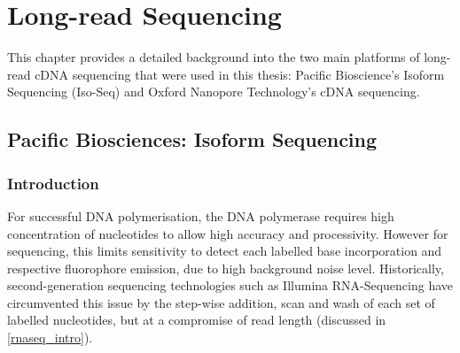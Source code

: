\chapter{Long-read Sequencing}\label{ch: long_read_sequencing}

This chapter provides a detailed background into the two main platforms of long-read cDNA sequencing that were used in this thesis: Pacific Bioscience's Isoform Sequencing (Iso-Seq) and Oxford Nanopore Technology's cDNA sequencing.  

\section{Pacific Biosciences: Isoform Sequencing}
\label{sec:pb_isoform_sequencing}

\subsection{Introduction}
For successful DNA polymerisation, the DNA polymerase requires high concentration of nucleotides to allow high accuracy and processivity. However for sequencing, this limits sensitivity to detect each labelled base incorporation and respective fluorophore emission, due to high background noise level. Historically, second-generation sequencing technologies such as Illumina RNA-Sequencing have circumvented this issue by the step-wise addition, scan and wash of each set of labelled nucleotides, but at a compromise of read length (discussed in \cref{rnaseq_intro}). 

